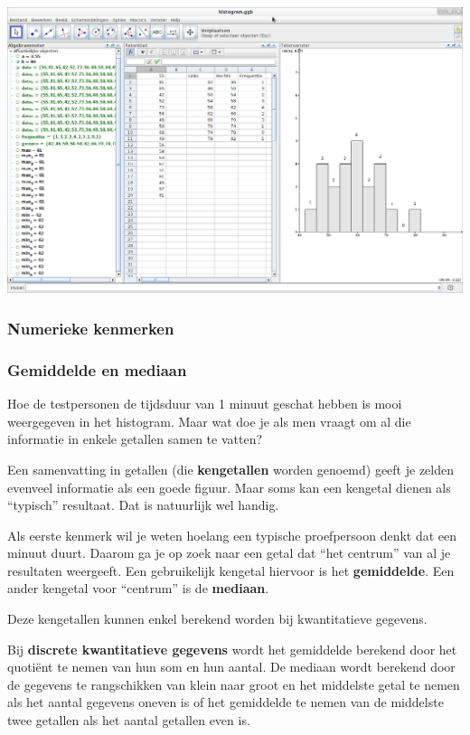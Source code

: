 \documentclass[11pt]{article}
\begin{document}
\begin{center}
  \includegraphics[width=14cm]{gg-histogram}
\end{center}

\subsubsection{Numerieke kenmerken}

\subsubsection*{Gemiddelde en mediaan}

Hoe de testpersonen de tijdsduur van 1 minuut geschat hebben is mooi weergegeven
in het histogram. Maar wat doe je als men vraagt om al die informatie in enkele
getallen samen te vatten?

Een samenvatting in getallen (die {\bf kengetallen} worden genoemd) geeft je zelden evenveel
informatie als een goede figuur. Maar soms kan een kengetal dienen als “typisch” resultaat. Dat is
natuurlijk wel handig.

Als eerste kenmerk wil je weten hoelang een typische proefpersoon denkt dat een minuut duurt.
Daarom ga je op zoek naar een getal dat “het centrum” van al je resultaten weergeeft. Een
gebruikelijk kengetal hiervoor is het {\bf gemiddelde}. Een ander kengetal voor “centrum” is de
{\bf mediaan}.

Deze kengetallen kunnen enkel berekend worden bij kwantitatieve gegevens.

Bij {\bf discrete kwantitatieve gegevens} wordt het gemiddelde berekend door het quotiënt te nemen van hun som en hun aantal. De mediaan wordt berekend door de gegevens te rangschikken van klein naar groot en het middelste getal te nemen als het aantal gegevens oneven is of het gemiddelde te nemen van de middelste twee getallen als het aantal getallen even is.
\end{document}
